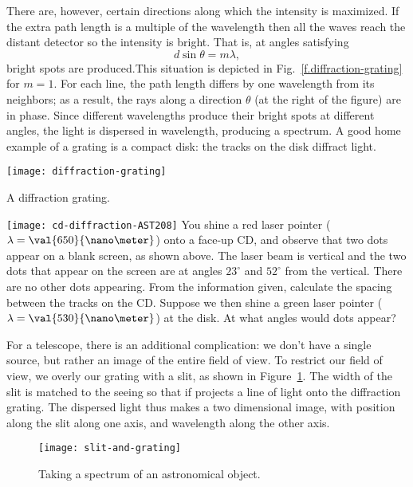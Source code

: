 There are, however, certain directions along which the intensity is maximized. If the extra path length is a multiple of the wavelength then all the waves reach the distant detector so the intensity is bright. That is, at angles satisfying
\begin{equation}
d\sin\theta = m\lambda,
\end{equation}
bright spots are produced.This situation is depicted in Fig.~\ref{f.diffraction-grating} for $m=1$. For each line, the path length differs by one wavelength from its neighbors; as a result, the rays along a direction $\theta$ (at the right of the figure) are in phase.  Since different wavelengths produce their bright spots at different angles, the light is dispersed in wavelength, producing a spectrum.
A good home example of a grating is a compact disk: the tracks on the disk diffract light.
\begin{marginfigure}[-6\baselineskip]
\texttt{[image: diffraction-grating]}
\caption{A diffraction grating.
\label{f.diffraction-grating}}
\end{marginfigure}
\clearpage

\begin{exercisebox}
\texttt{[image: cd-diffraction-AST208]}
You shine a red laser pointer ($\lambda=\val{650}{\nano\meter}$) onto a face-up CD, and observe that two dots appear on a blank screen, as shown above. The laser beam is vertical and the two dots that appear on the screen are at angles $23^{\circ}$ and $52^{\circ}$ from the vertical. There are no other dots appearing. From the information given, calculate the spacing between the tracks on the CD.  Suppose we then shine a green laser pointer ($\lambda=\val{530}{\nano\meter}$) at the disk. At what angles would dots appear?
\end{exercisebox}

For a telescope, there is an additional complication: we don't have a single source, but rather an image of the entire field of view. To restrict our field of view, we overly our grating with a slit, as shown in Figure~\ref{f.slit-and-grating}. The width of the slit is matched to the seeing so that if projects a line of light onto the diffraction grating. The dispersed light thus makes a two dimensional image, with position along the slit along one axis, and wavelength along the other axis.

\begin{figure}[htbp]
\centering\texttt{[image: slit-and-grating]}
\caption{Taking a spectrum of an astronomical object.
\label{f.slit-and-grating}}
\end{figure}

